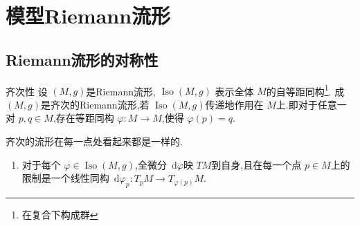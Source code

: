 \documentclass[../../几何与拓扑.tex]{subfiles}
\begin{document}
    
\ifSubfilesClassLoaded{
    \frontmatter

    \tableofcontents
    
    \mainmatter
}{}

\chapter{模型Riemann流形}

\section{Riemann流形的对称性}

\begin{definition}{齐次性}
    设 \(  \left( M,g \right)   \)是Riemann流形, \(  \operatorname{Iso} \left( M,g \right)   \)  表示全体 \(  M  \)的自等距同构\footnote{在复合下构成群}. 成 \(  \left( M,g \right)   \)是齐次的Riemann流形,若 \(  \operatorname{Iso} \left( M,g \right)   \)传递地作用在 \(  M  \)上.即对于任意一对 \(  p,q \in M  \),存在等距同构 \(   \varphi :M\to M  \),使得 \(   \varphi \left( p \right)=  q   \).      
\end{definition}
\begin{note}
    齐次的流形在每一点处看起来都是一样的.
\end{note}
\begin{remark}
    \begin{enumerate}
        \item 对于每个 \(   \varphi  \in \operatorname{Iso} \left( M,g \right)   \),全微分 \(  \,\mathrm{d}  \varphi   \)映 \(  TM  \)到自身,且在每一个点 \(  p \in M  \)上的限制是一个线性同构 \(  \,\mathrm{d}  \varphi _{p}:T_{p}M\to T_{ \varphi \left( p \right) }M  \).  
    \end{enumerate}
    
\end{remark}
\end{document}
